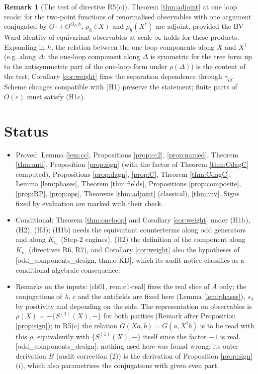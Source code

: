 \documentclass[11pt]{article}
\theoremstyle{definition}
\newtheorem{remark}[definition]{Remark}
\begin{document}
\begin{remark}[The test of directive R5(c)]
Theorem \ref{thm:adjoint} at one loop reads: for the two-point functions of renormalised observables with one argument conjugated by $O\mapsto O^{\Theta_I,\hbar}$, $\rho_\hbar(X)$ and $\rho_\hbar(X^\dagger)$ are adjoint, provided the BV Ward identity of equivariant observables at scale $\infty$ holds for these products. Expanding in $\hbar$, the relation between the one-loop components along $X$ and $X^\dagger$ (e.g. along $\Delta$: the one-loop component along $\Delta$ is symmetric for the tree form up to the antisymmetric part of the one-loop form under $\rho(\Delta)$) is the content of the test; Corollary \ref{cor:weight} fixes the separation dependence through $\gamma_O$. Scheme changes compatible with (H1) preserve the statement; finite parts of $O(\varepsilon)$ must satisfy (H1c).
\end{remark}

\section{Status}

\begin{itemize}
\item Proved: Lemma \ref{lem:cc}, Propositions \ref{prop:cc2}, \ref{prop:named}, Theorem \ref{thm:anti}, Proposition \ref{prop:sign} (with the factor of Theorem \ref{thm:CdagC} computed), Propositions \ref{prop:dagn}, \ref{prop:C}, Theorem \ref{thm:CdagC}, Lemma \ref{lem:phases}, Theorem \ref{thm:fields}, Propositions \ref{prop:composite}, \ref{prop:RP}, \ref{prop:ops}, Theorems \ref{thm:adjoint} (classical), \ref{thm:inv}. Signs fixed by evaluation are marked with their check.
\item Conditional: Theorem \ref{thm:oneloop} and Corollary \ref{cor:weight} under (H1b), (H2), (H3); (H1b) needs the equivariant counterterms along odd generators and along $K_{v_1}$ (Step-2 engines), (H2) the definition of the component along $K_{v_1}$ (directives R6, R7), and Corollary \ref{cor:weight} also the hypotheses of [odd\_components\_design, thm:o-KD], which its audit notice classifies as a conditional algebraic consequence.
\item Remarks on the inputs: [ch01, rem:c1-real] fixes the real slice of $A$ only; the conjugations of $\lambda$, $c$ and the antifields are fixed here (Lemma \ref{lem:phases}), $s_\lambda$ by positivity and depending on the side. The representation on observables is $\rho(X)=-\{S^{(1)}(X),-\}$ for both parities (Remark after Proposition \ref{prop:sign}); in R5(c) the relation $G(Xa,b)=G(a,X^\dagger b)$ is to be read with this $\rho$, equivalently with $\{S^{(1)}(X),-\}$ itself since the factor $-1$ is real. [odd\_components\_design]: nothing used here was found wrong; its outer derivation $B$ (audit correction (2)) is the derivation of Proposition \ref{prop:sign}(i), which also parametrises the conjugations with given even part.
\end{itemize}
\end{document}
